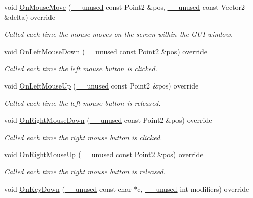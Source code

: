 \begin{DoxyCompactItemize}
\item 
void \hyperlink{classGraphicsArenaViewer_a74b5c524369a62ba419c89677c646d9e}{On\+Mouse\+Move} (\hyperlink{common_8h_a2e3484535ee610c8e19e9859563abe48}{\+\_\+\+\_\+unused} const Point2 \&pos, \hyperlink{common_8h_a2e3484535ee610c8e19e9859563abe48}{\+\_\+\+\_\+unused} const Vector2 \&delta) override
\begin{DoxyCompactList}\small\item\em Called each time the mouse moves on the screen within the G\+UI window. \end{DoxyCompactList}\item 
void \hyperlink{classGraphicsArenaViewer_adf2fb01c3ca8b1774f031d68616b288c}{On\+Left\+Mouse\+Down} (\hyperlink{common_8h_a2e3484535ee610c8e19e9859563abe48}{\+\_\+\+\_\+unused} const Point2 \&pos) override
\begin{DoxyCompactList}\small\item\em Called each time the left mouse button is clicked. \end{DoxyCompactList}\item 
void \hyperlink{classGraphicsArenaViewer_abe4f11ab9bfb6055280ddf2b671d7032}{On\+Left\+Mouse\+Up} (\hyperlink{common_8h_a2e3484535ee610c8e19e9859563abe48}{\+\_\+\+\_\+unused} const Point2 \&pos) override
\begin{DoxyCompactList}\small\item\em Called each time the left mouse button is released. \end{DoxyCompactList}\item 
void \hyperlink{classGraphicsArenaViewer_a178a9f09ff241d4dc032b6d0998cc9c6}{On\+Right\+Mouse\+Down} (\hyperlink{common_8h_a2e3484535ee610c8e19e9859563abe48}{\+\_\+\+\_\+unused} const Point2 \&pos) override
\begin{DoxyCompactList}\small\item\em Called each time the right mouse button is clicked. \end{DoxyCompactList}\item 
void \hyperlink{classGraphicsArenaViewer_a5dfa16dca83575e253b6d3ea344f8746}{On\+Right\+Mouse\+Up} (\hyperlink{common_8h_a2e3484535ee610c8e19e9859563abe48}{\+\_\+\+\_\+unused} const Point2 \&pos) override
\begin{DoxyCompactList}\small\item\em Called each time the right mouse button is released. \end{DoxyCompactList}\item 
void \hyperlink{classGraphicsArenaViewer_ab0001d4a3ebde2b1f5b4cb7770824726}{On\+Key\+Down} (\hyperlink{common_8h_a2e3484535ee610c8e19e9859563abe48}{\+\_\+\+\_\+unused} const char $\ast$c, \hyperlink{common_8h_a2e3484535ee610c8e19e9859563abe48}{\+\_\+\+\_\+unused} int modifiers) override

\end{DoxyCompactItemize}
